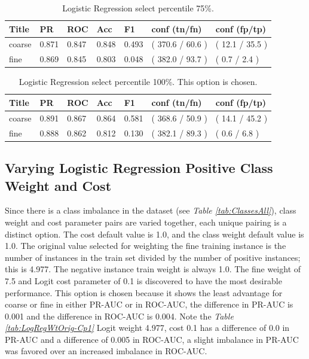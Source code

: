 \documentclass[ms]{nuthesis}
\begin{document}
\FloatBarrier
\begin{table}[H]
\centering
\caption{Logistic Regression select percentile 75\%.}
\label{tab:LogRegSel75}
\begin{tabular}{|l||l||l||l||l||l||l|}\toprule
Title & PR & ROC & Acc & F1 & conf (tn/fn) & conf (fp/tp) \\ \midrule
coarse & 0.871 & 0.847 & 0.848 & 0.493 & ( 370.6 / 60.6 ) & ( 12.1 / 35.5 ) \\
fine & 0.869 & 0.845 & 0.803 & 0.048 & ( 382.0 / 93.7 ) & ( 0.7 / 2.4 ) \\ \bottomrule
\end{tabular}
\end{table}
\FloatBarrier


\FloatBarrier
\begin{table}[H]
\centering
\caption{Logistic Regression select percentile 100\%. This option is chosen.}
\label{tab:LogRegMinMax}
\begin{tabular}{|l||l||l||l||l||l||l|}\toprule
Title & PR & ROC & Acc & F1 & conf (tn/fn) & conf (fp/tp) \\ \midrule
coarse & 0.891 & 0.867 & 0.864 & 0.581 & ( 368.6 / 50.9 ) & ( 14.1 / 45.2 ) \\
fine & 0.888 & 0.862 & 0.812 & 0.130 & ( 382.1 / 89.3 ) & ( 0.6 / 6.8 ) \\ \bottomrule
\end{tabular}
\end{table}
\FloatBarrier


\subsection{Varying Logistic Regression Positive Class Weight and Cost}
\label{sect:logitClsWeight}
\par Since there is a class imbalance in the dataset (see \textit{Table \ref{tab:ClassesAll}}),
class weight and cost parameter pairs are varied together, each unique pairing is a distinct option.
The cost default value is 1.0, and the class weight default value is 1.0. The original value selected for weighting
the fine training instance is the number of instances in the train set divided by the number of positive
instances; this is 4.977. The negative instance train weight is always 1.0. The fine weight of 7.5
and Logit cost parameter of 0.1 is discovered to have the most desirable performance. This option is chosen
because it shows the least advantage for coarse
or fine in either PR-AUC or in ROC-AUC, the difference in PR-AUC is 0.001 and the difference in
ROC-AUC is 0.004. Note the \textit{Table \ref{tab:LogRegWtOrig-Cp1}}
Logit weight 4.977, cost 0.1 has a difference of 0.0 in PR-AUC and a difference of 0.005 in ROC-AUC, a slight
imbalance in PR-AUC was favored over an increased imbalance in ROC-AUC.
\end{document}
